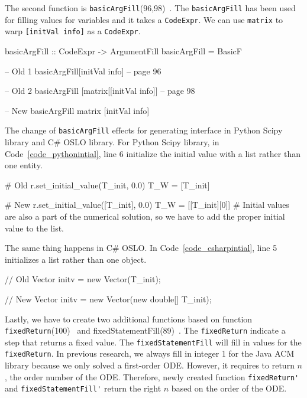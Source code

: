 The second function is \verb|basicArgFill|(96,98)~\citep{brooks}. The \verb|basicArgFill| has been used for filling values for variables and it takes a \verb|CodeExpr|. We can use \verb|matrix| to warp \verb|[initVal info]| as a \verb|CodeExpr|.

\begin{listing}[ht]
\begin{haskell1}
basicArgFill :: CodeExpr -> ArgumentFill
basicArgFill = BasicF
\end{haskell1}
\end{listing}

\begin{listing}[ht]
\begin{haskell1}
-- Old 1
basicArgFill[initVal info] -- page 96

-- Old 2
basicArgFill [matrix[[initVal info]] -- page 98

-- New 
basicArgFill matrix [initVal info]
\end{haskell1}
\end{listing}
The change of \verb|basicArgFill| effects for generating interface in Python Scipy library and C\# OSLO library. For Python Scipy library, in Code~\ref{code_pythonintial}, line 6 initialize the initial value with a list rather than one entity.

\begin{listing}[ht]
\begin{python1}
# Old 
  r.set_initial_value(T_init, 0.0)
  T_W = [T_init]

# New 
  r.set_initial_value([T_init], 0.0)
  T_W = [[T_init][0]] # Initial values are also a part of the numerical solution, so we have to add the proper initial value to the list.
\end{python1}
\label{code_pythonintial}
\end{listing}
The same thing happens in C\# OSLO. In Code~\ref{code_csharpintial}, line 5 initializes a list rather than one object.  
\begin{listing}[ht]
\begin{csharp1}
// Old 
Vector initv = new Vector(T_init);

// New 
Vector initv = new Vector(new double[] {T_init});
\end{csharp1}
\label{code_csharpintial}
\end{listing}

Lastly, we have to create two additional functions based on function \verb|fixedReturn|(100)~\citep{brooks} and fixedStatementFill(89)~\citep{brooks}. The \verb|fixedReturn| indicate a step that returns a fixed value. The \verb|fixedStatementFill| will fill in values for the \verb|fixedReturn|. In previous research, we always fill in integer 1 for the Java ACM library because we only solved a first-order ODE. However, it requires to return $n$, the order number of the ODE. Therefore, newly created function \verb|fixedReturn'| and \verb|fixedStatementFill'| return the right $n$ based on the order of the ODE.

